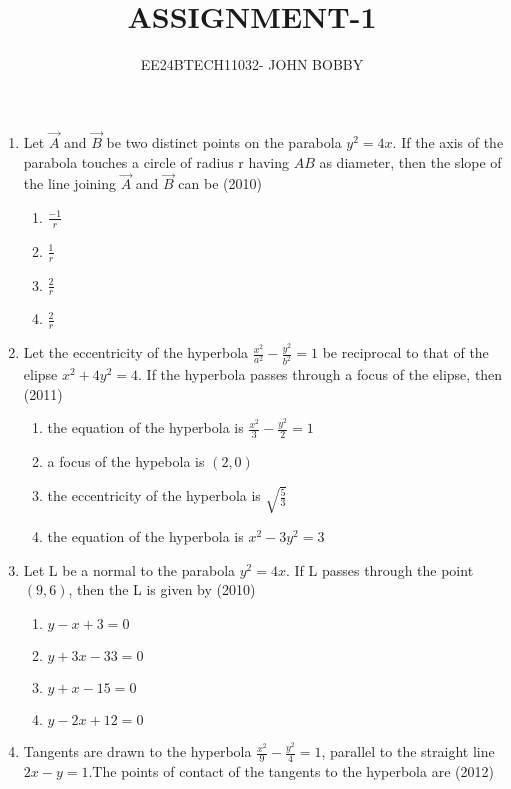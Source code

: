 \documentclass[journal,12pt,onecolumn]{IEEEtran}
\theoremstyle{remark}
\begin{document}

\vspace{3cm}

\title{ASSIGNMENT-1}
\author{EE24BTECH11032- JOHN BOBBY}
\maketitle

\bigskip

\begin{enumerate}
	\item Let $\vec{A}$ and $\vec{B}$ be two distinct points on the parabola $y^2=4x$. If
the axis of the parabola touches a circle of radius r having
		$AB$ as diameter, then the slope of the line joining $\vec{A}$ and $\vec{B}$
 can be 
		\hfill(2010)
		
		\begin{enumerate}
			\item$\frac{-1}{r}$
			\item$\frac{1}{r}$
			\item$\frac{2}{r}$
			\item$\frac{2}{r}$
		\end{enumerate}
	\item Let the eccentricity of the hyperbola $\frac{x^2}{a^2}-\frac{y^2}{b^2}=1$ be reciprocal to that of the elipse $x^2+4y^2=4$. If the hyperbola
	passes through a focus of the elipse, then 
		\hfill(2011)
		
		\begin{enumerate}
			\item the equation of the hyperbola is $\frac{x^2}{3}-\frac{y^2}{2}=1$
			\item a focus of the hypebola is $(2,0)$
			\item the eccentricity of the hyperbola is $\sqrt{\frac{5}{3}}$
			\item the equation of the hyperbola is $x^2-3y^2=3$
		\end{enumerate}
	\item Let L be a normal to the parabola $y^2=4x$. If L passes through the point $(9,6)$, then the L is given by 
		\hfill(2010)
		
		\begin{enumerate}
			\item $y-x+3=0$
			\item $y+3x-33=0$
			\item $y+x-15=0$
			\item $y-2x+12=0$
		\end{enumerate}
	\item Tangents are drawn to the hyperbola $\frac{x^2}{9}-\frac{y^2}{4}=1$, parallel to the straight line $2x-y=1$.The points of contact of the tangents to the hyperbola
		are  
		\hfill(2012)
		

\end{enumerate}
\end{document}
